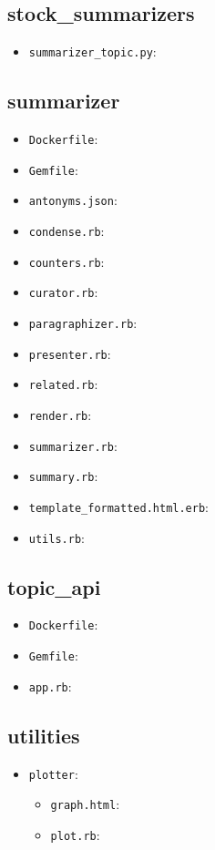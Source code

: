 \subsection*{stock\_summarizers}
  \begin{itemize}
    \item
      \texttt{summarizer\_topic.py}:
  \end{itemize}

\subsection*{summarizer}

\begin{itemize}
  \item
    \texttt{Dockerfile}:
  \item
    \texttt{Gemfile}:
  \item
    \texttt{antonyms.json}:
  \item
    \texttt{condense.rb}:
  \item
    \texttt{counters.rb}:
  \item
    \texttt{curator.rb}:
  \item
    \texttt{paragraphizer.rb}:
  \item
    \texttt{presenter.rb}:
  \item
    \texttt{related.rb}:
  \item
    \texttt{render.rb}:
  \item
    \texttt{summarizer.rb}:
  \item
    \texttt{summary.rb}:
  \item
    \texttt{template\_formatted.html.erb}:
  \item
    \texttt{utils.rb}:
\end{itemize}

\subsection*{topic\_api}
  \begin{itemize}
    \item
      \texttt{Dockerfile}:
    \item
      \texttt{Gemfile}:
    \item
      \texttt{app.rb}:
  \end{itemize}

\subsection*{utilities}
  \begin{itemize}
    \item
      \texttt{plotter}:

      \begin{itemize}
      \item
        \texttt{graph.html}:
      \item
        \texttt{plot.rb}:
      \end{itemize}
  \end{itemize}
